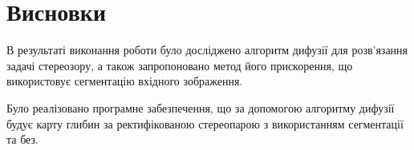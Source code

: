 \chapter*{Висновки}

В результаті виконання роботи було досліджено
алгоритм дифузії для розв'язання задачі стереозору,
а також запропоновано метод його прискорення,
що використовує сегментацію вхідного зображення.

Було реалізовано програмне забезпечення,
що за допомогою алгоритму дифузії будує карту глибин
за ректифікованою стереопарою з використанням сегментації та без.

%
%
%
